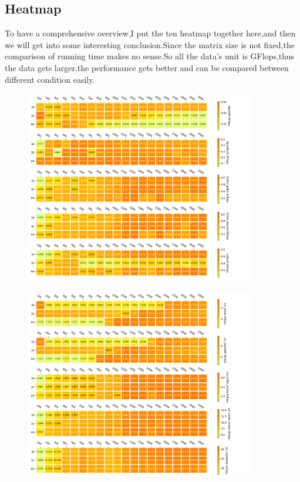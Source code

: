 \documentclass[11pt]{scrartcl} %
\begin{document}
\subsection{Heatmap}
To have a comprehensive overview,I put the ten heatmap together here,and then we will get into some interesting conclusion.Since the matrix size is not fixed,the comparison of running time makes no sense.So all the data's unit is GFlops,thus the data gets larger,the performance gets better and can be compared between different condition easily.
\begin{figure}[H]
    \centering
    \includegraphics[width=0.9\textwidth]{Figure_1.png}
    \label{}
\end{figure}
\begin{figure}[H]
    \centering
    \includegraphics[width=0.9\textwidth]{Figure_2.png}
    \label{}
\end{figure}
\end{document}

